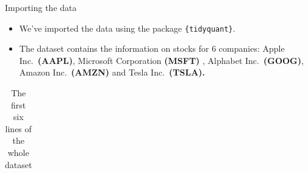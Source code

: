 \documentclass[
  12pt]{article}
\providecommand{\tightlist}{%
  \setlength{\itemsep}{0pt}\setlength{\parskip}{0pt}}\usepackage{longtable,booktabs,array}
\theoremstyle{definition}
\theoremstyle{remark}
\begin{document}
Importing the data

\begin{itemize}
\tightlist
\item
  We've imported the data using the package \texttt{\{tidyquant\}}.
\end{itemize}

\begin{itemize}
\tightlist
\item
  The dataset contains the information on stocks for 6 companies: Apple
  Inc.~\textbf{(AAPL)}, Microsoft Corporation \textbf{(MSFT)} , Alphabet
  Inc.~\textbf{(GOOG)}, Amazon Inc.~\textbf{(AMZN)} and Tesla
  Inc.~\textbf{(TSLA).}
\end{itemize}

\begin{longtable}[]{@{}
  >{\raggedright\arraybackslash}p{}
  >{\raggedright\arraybackslash}p{}
  >{\raggedleft\arraybackslash}p{}
  >{\raggedleft\arraybackslash}p{}
  >{\raggedleft\arraybackslash}p{}
  >{\raggedleft\arraybackslash}p{}
  >{\raggedleft\arraybackslash}p{}
  >{\raggedleft\arraybackslash}p{}@{}}

\caption{\label{tbl-data}The first six lines of the whole dataset}

\tabularnewline


\end{longtable}
\end{document}
